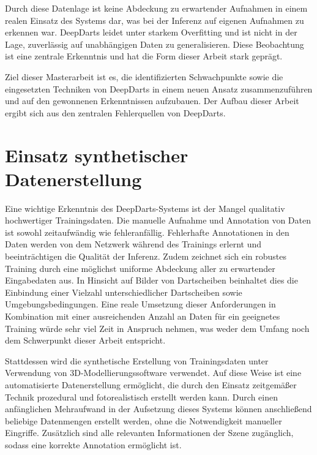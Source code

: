 Durch diese Datenlage ist keine Abdeckung zu erwartender Aufnahmen in einem realen Einsatz des Systems dar, was bei der Inferenz auf eigenen Aufnahmen zu erkennen war. DeepDarts leidet unter starkem Overfitting und ist nicht in der Lage, zuverlässig auf unabhängigen Daten zu generalisieren. Diese Beobachtung ist eine zentrale Erkenntnis und hat die Form dieser Arbeit stark geprägt.

Ziel dieser Masterarbeit ist es, die identifizierten Schwachpunkte sowie die eingesetzten Techniken von DeepDarts in einem neuen Ansatz zusammenzuführen und auf den gewonnenen Erkenntnissen aufzubauen. Der Aufbau dieser Arbeit ergibt sich aus den zentralen Fehlerquellen von DeepDarts.



\section{Einsatz synthetischer Datenerstellung}
\label{sec:einsatz_daten}

Eine wichtige Erkenntnis des DeepDarts-Systems ist der Mangel qualitativ hochwertiger Trainingsdaten. Die manuelle Aufnahme und Annotation von Daten ist sowohl zeitaufwändig wie fehleranfällig. Fehlerhafte Annotationen in den Daten werden von dem Netzwerk während des Trainings erlernt und beeinträchtigen die Qualität der Inferenz. Zudem zeichnet sich ein robustes Training durch eine möglichst uniforme Abdeckung aller zu erwartender Eingabedaten aus. In Hinsicht auf Bilder von Dartscheiben beinhaltet dies die Einbindung einer Vielzahl unterschiedlicher Dartscheiben sowie Umgebungsbedingungen. Eine reale Umsetzung dieser Anforderungen in Kombination mit einer ausreichenden Anzahl an Daten für ein geeignetes Training würde sehr viel Zeit in Anspruch nehmen, was weder dem Umfang noch dem Schwerpunkt dieser Arbeit entspricht.

Stattdessen wird die synthetische Erstellung von Trainingsdaten unter Verwendung von 3D-Modellierungssoftware verwendet. Auf diese Weise ist eine automatisierte Datenerstellung ermöglicht, die durch den Einsatz zeitgemäßer Technik prozedural und fotorealistisch erstellt werden kann. Durch einen anfänglichen Mehraufwand in der Aufsetzung dieses Systems können anschließend beliebige Datenmengen erstellt werden, ohne die Notwendigkeit manueller Eingriffe. Zusätzlich sind alle relevanten Informationen der Szene zugänglich, sodass eine korrekte Annotation ermöglicht ist.

